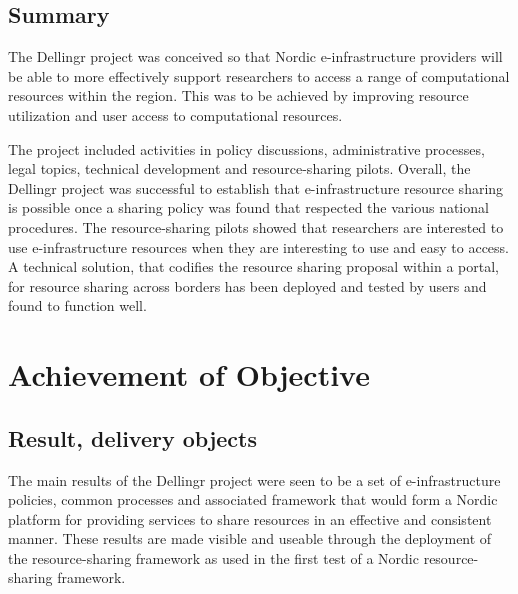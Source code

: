 \documentclass{article}
\newcommand{\dell}{Dellingr\xspace}
\newcommand{\einfra}{e-infrastructure\xspace}
\newcommand{\pilot}{first test of a Nordic resource-sharing framework\xspace}
\begin{document}
\subsection{Summary}

The \dell project was conceived so that Nordic \einfra providers will be able to more effectively support researchers to access a range of computational resources within the region.
This was to be achieved by improving resource utilization and user access to computational resources.

The project included activities in policy discussions, administrative processes, legal topics, technical development and resource-sharing pilots.
Overall, the \dell project was successful to establish that \einfra resource sharing is possible once a sharing policy was found that
respected the various national procedures.
The resource-sharing pilots showed that researchers are interested to use \einfra resources when they are interesting to use and easy to access.
A technical solution, that codifies the resource sharing proposal within a portal, for resource sharing across borders has
been deployed and tested by users and found to function well.

\section{Achievement of Objective}

\subsection{Result, delivery objects}

The main results of the \dell project were seen to be a set of \einfra policies, common processes and associated framework that would form a Nordic platform for providing services to share resources in an effective and consistent manner.
These results are made visible and useable through the deployment of the resource-sharing framework as used in the \pilot.
\end{document}
